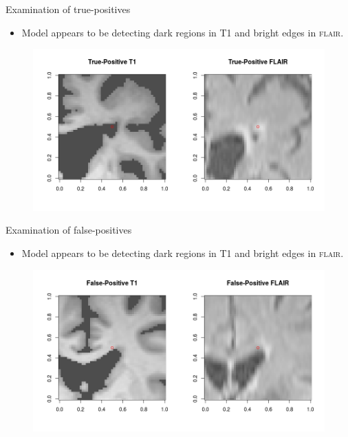 \documentclass{beamer}
\begin{document}
\begin{frame}{Examination of true-positives}
\begin{itemize}
\item Model appears to be detecting dark regions in T1 and bright edges in \textsc{flair}.
\end{itemize}
\begin{figure}
\centering
\includegraphics[width=\linewidth]{../Thesis_Docs/Images/7_TP_t1_flair.png}
\end{figure}
\end{frame}

\begin{frame}{Examination of false-positives}
\begin{itemize}
\item Model appears to be detecting dark regions in T1 and bright edges in \textsc{flair}.
\end{itemize}
\begin{figure}
\centering
\includegraphics[width=\linewidth]{../Thesis_Docs/Images/7_FP_t1_flair2.png}
\end{figure}
\end{frame}
\end{document}
